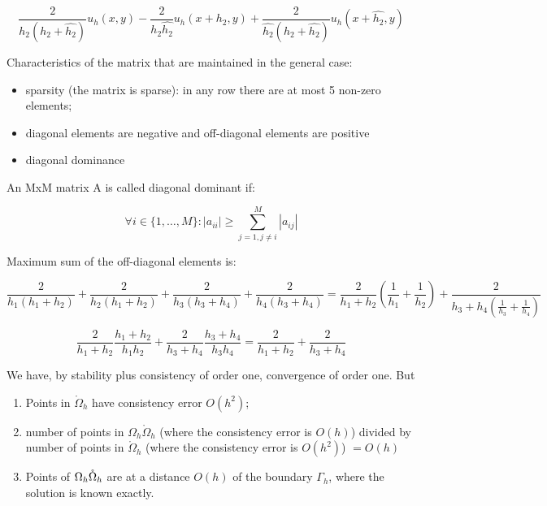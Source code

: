 \begin{equation*}
\frac{2}{h_2 (h_2 + \hat{h_2})} u_h(x, y) - \frac{2}{h_2 \hat{h_2}} u_h(x + h_2, y)+ \frac{2}{\hat{h_2}(h_2 + \hat{h_2})} u_h(x + \hat{h_2}, y)
\end{equation*}

Characteristics of the matrix that are maintained in the general case:
\begin{itemize}
	\item sparsity (the matrix is sparse): in any row there are at most 5 non-zero elements;
	\item diagonal elements are negative and off-diagonal elements are positive
	\item diagonal dominance
\end{itemize}

An MxM matrix A is called diagonal dominant if:

\begin{equation*}
\forall i \in \{1, \dots, M\}: |a_{ii}| \ge \sum_{j=1, j \neq i}^{M} |a_{ij}|
\end{equation*}

Maximum sum of the off-diagonal elements is:

\begin{equation*}
\frac{2}{h_1 (h_1 + h_2)} + \frac{2}{h_2 (h_1 + h_2)} + \frac{2}{h_3 (h_3 + h_4)} + \frac{2}{h_4 (h_3 + h_4)} = \frac{2}{h_1 + h_2} (\frac{1}{h_1} + \frac{1}{h_2}) + \frac{2}{h_3 + h_4 (\frac{1}{h_3} + \frac{1}{h_4})}
\end{equation*}

\begin{equation*}
\frac{2}{h_1 + h_2} \frac{h_1 + h_2}{h_1 h_2} + \frac{2}{h_3 + h_4} \frac{h_3 + h_4}{h_3 h_4} = \frac{2}{h_1 + h_2} + \frac{2}{h_3 + h_4}
\end{equation*}

We have, by stability plus consistency of order one, convergence of order one. But
\begin{enumerate}
	\item Points in $\mathring{\Omega}_h$ have consistency error $O(h^2)$;
	\item number of points in $\Omega_h \mathring{\Omega}_h$ (where the consistency error is $O(h)$)  divided by number of points in $\mathring{\Omega}_h$ (where the consistency error is $O(h^2)$) $= O(h)$
	\item Points of $\Omega_h \\ \mathring{\Omega}_h$ are at a distance $O(h)$ of the boundary $\Gamma_h$, where the solution is known exactly.
\end{enumerate}

